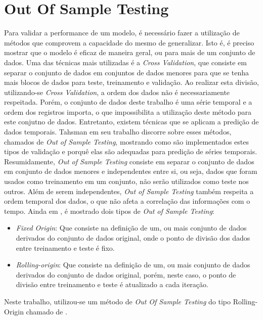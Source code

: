\section{Out Of Sample Testing}
Para validar a performance de um modelo, é necessário fazer a utilização de métodos que comprovem a capacidade do mesmo de generalizar. Isto é, é preciso mostrar que o modelo é eficaz de maneira geral, ou para mais de um conjunto de dados. Uma das técnicas mais utilizadas é a \textit{Cross Validation}, que consiste em separar o conjunto de dados em conjuntos de dados menores para que se tenha mais blocos de dados para teste, treinamento e validação. Ao realizar esta divisão, utilizando-se \textit{Cross Validation}, a ordem dos dados não é necessariamente respeitada. Porém, o conjunto de dados deste trabalho é uma série temporal e a ordem dos registros importa, o que impossibilita a utilização deste método para este conjutno de dados. Entretanto, existem técnicas que se aplicam a predição de dados temporais. Tahsman em seu trabalho \cite{Tashman_2000} discorre sobre esses métodos, chamados de \textit{Out of Sample Testing}, mostrando como são implementados estes tipos de validação e porquê elas são adequadas para predição de séries temporais. Resumidamente, \textit{Out of Sample Testing} consiste em separar o conjunto de dados em conjunto de dados menores e independentes entre si, ou seja, dados que foram usados como treinamento em um conjunto, não serão utilizados como teste nos outros. Além de serem independentes, \textit{Out of Sample Testing} também respeita a ordem temporal dos dados, o que não afeta a correlação das informações com o tempo. Ainda em \cite{Tashman_2000}, é mostrado dois tipos de \textit{Out of Sample Testing}:

\begin{itemize}
    \item \textit{Fixed Origin}: Que consiste na definição de um, ou mais conjunto de dados derivados do conjunto de dados original, onde o ponto de divisão dos dados entre treinamento e teste é fixo.
    \item \textit{Rolling-origin}: Que consiste na definição de um, ou mais conjunto de dados derivados do conjunto de dados original, porém, neste caso, o ponto de divisão entre treinamento e teste é atualizado a cada iteração.
\end{itemize}

Neste trabalho, utilizou-se um método de \textit{Out Of Sample Testing} do tipo Rolling-Origin chamado de . 